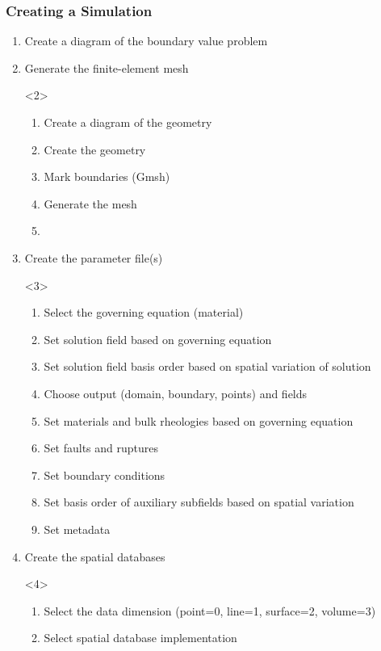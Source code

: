 \documentclass[aspectratio=169]{beamer}
\begin{document}
\begin{frame}[t]
  \frametitle{Creating a Simulation}
  \summary{}

  \begin{enumerate}
  \item Create a diagram of the boundary value problem
  \item Generate the finite-element mesh
    \begin{onlyenv}<2>
      \begin{enumerate}
      \item Create a diagram of the geometry
      \item Create the geometry
      \item Mark boundaries (Gmsh)
      \item Generate the mesh
      \item {}
      \end{enumerate}
    \end{onlyenv}
  \item Create the parameter file(s)
    \begin{onlyenv}<3>
      \begin{enumerate}
      \item Select the governing equation (material)
      \item Set solution field based on governing equation
      \item Set solution field basis order based on spatial variation of solution
      \item Choose output (domain, boundary, points) and fields
      \item Set materials and bulk rheologies based on governing equation
      \item Set faults and ruptures
      \item Set boundary conditions
      \item Set basis order of auxiliary subfields based on spatial variation
      \item Set metadata
      \end{enumerate}
    \end{onlyenv}
  \item Create the spatial databases
    \begin{onlyenv}<4>
      \begin{enumerate}
      \item Select the data dimension (point=0, line=1, surface=2, volume=3)
      \item Select spatial database implementation

\end{enumerate}
\end{onlyenv}
\end{enumerate}
\end{frame}
\end{document}
